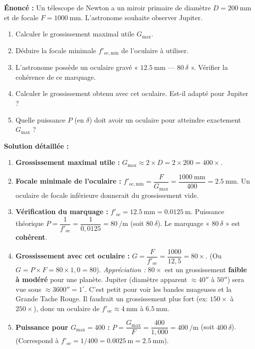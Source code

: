 \documentclass[11pt]{article}
\begin{document}
\begin{exoresolu}
\textbf{Énoncé :} Un télescope de Newton a un miroir primaire de diamètre $D = \SI{200}{\mm}$ et de focale $F = \SI{1000}{\mm}$. L'astronome souhaite observer Jupiter.
\begin{enumerate}
\item Calculer le grossissement maximal utile $G_{\text{max}}$.
\item Déduire la focale minimale $f'_{oc,\text{min}}$ de l'oculaire à utiliser.
\item L'astronome possède un oculaire gravé « $\SI{12,5}{\mm}$ — $\SI{80}{\delta}$ ». Vérifier la cohérence de ce marquage.
\item Calculer le grossissement obtenu avec cet oculaire. Est-il adapté pour Jupiter ?
\item Quelle puissance $P$ (en $\delta$) doit avoir un oculaire pour atteindre exactement $G_{\text{max}}$ ?
\end{enumerate}

\tcblower
\textbf{Solution détaillée :}
\begin{enumerate}
\item \textbf{Grossissement maximal utile :} $G_{\text{max}} \approx 2 \times D = 2 \times 200 = \boxed{400\times}$.
\item \textbf{Focale minimale de l'oculaire :} $f'_{oc,\text{min}} = \dfrac{F}{G_{\text{max}}} = \dfrac{\SI{1000}{\mm}}{400} = \boxed{\SI{2,5}{\mm}}$. Un oculaire de focale inférieure donnerait du grossissement vide.
\item \textbf{Vérification du marquage :} $f'_{oc} = \SI{12,5}{\mm} = \SI{0,0125}{\m}$. Puissance théorique $P = \dfrac{1}{f'_{oc}} = \dfrac{1}{0,0125} = \SI{80}{\per\meter}$ (soit $\SI{80}{\delta}$). Le marquage « $\SI{80}{\delta}$ » est \textbf{cohérent}.
\item \textbf{Grossissement avec cet oculaire :} $G = \dfrac{F}{f'_{oc}} = \dfrac{1000}{12,5} = \boxed{80\times}$. (Ou $G = P \times F = 80 \times 1,0 = 80$).
\textit{Appréciation :} $80\times$ est un grossissement \textbf{faible à modéré} pour une planète. Jupiter (diamètre apparent $\approx 40''$ à $50''$) sera vue sous $\approx 3600'' = \num{1}^\circ$. C'est petit pour voir les bandes nuageuses et la Grande Tache Rouge. Il faudrait un grossissement plus fort (ex: $150\times$ à $250\times$), donc un oculaire de $f'_{oc} \approx \SI{4}{\mm}$ à $\SI{6,5}{\mm}$.
\item \textbf{Puissance pour $G_{\text{max}} = 400$ :} $P = \dfrac{G_{\text{max}}}{F} = \dfrac{400}{1,000} = \boxed{\SI{400}{\per\meter}}$ (soit $\SI{400}{\delta}$). (Correspond à $f'_{oc} = 1/400 = \SI{0,0025}{\m} = \SI{2,5}{\mm}$).
\end{enumerate}
\end{exoresolu}
\end{document}
